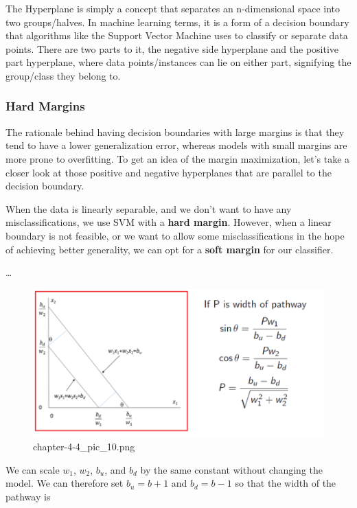 \documentclass[11pt]{article}
\begin{document}
    The Hyperplane is simply a concept that separates an n-dimensional space
into two groups/halves. In machine learning terms, it is a form of a
decision boundary that algorithms like the Support Vector Machine uses
to classify or separate data points. There are two parts to it, the
negative side hyperplane and the positive part hyperplane, where data
points/instances can lie on either part, signifying the group/class they
belong to.

    \hypertarget{hard-margins}{%
\subsubsection{Hard Margins}\label{hard-margins}}

The rationale behind having decision boundaries with large margins is
that they tend to have a lower generalization error, whereas models with
small margins are more prone to overfitting. To get an idea of the
margin maximization, let's take a closer look at those positive and
negative hyperplanes that are parallel to the decision boundary.

When the data is linearly separable, and we don't want to have any
misclassifications, we use SVM with a \textbf{hard margin}. However,
when a linear boundary is not feasible, or we want to allow some
misclassifications in the hope of achieving better generality, we can
opt for a \textbf{soft margin} for our classifier.

\ldots{}

    \begin{figure}
\centering
\includegraphics{./pic/chapter-4-3_pic_1.png}
\caption{chapter-4-4\_pic\_10.png}
\end{figure}

    We can scale \(w_1\), \(w_2\), \(b_u\), and \(b_d\) by the same constant
without changing the model. We can therefore set \(b_u=b+1\) and
\(b_d=b-1\) so that the width of the pathway is
\end{document}
